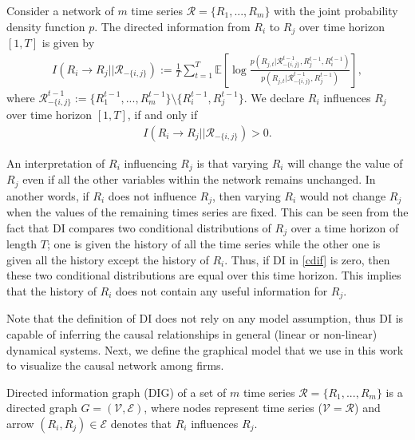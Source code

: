 \clearpage

 \begin{definition}\label{cdi}
Consider a network of $m$ time series $\mathcal{R}=\{R_1,...,R_m\}$ with the joint probability density function $p$. The directed information from $R_i$ to $R_j$ over time horizon $[1,T]$ is given by
\begin{align}\label{cdif}
I(R_i\rightarrow R_j||\mathcal{R}_{-\{i,j\}}):=\frac{1}{T}\sum_{t=1}^T\mathbb{E}\left[\log\frac{p(R_{j,t}|\mathcal{R}^{t-1}_{-\{i,j\}},R_{j}^{t-1},R_{i}^{t-1})}{p(R_{j,t}|\mathcal{R}^{t-1}_{-\{i,j\}},R_{j}^{t-1})}\right],
\end{align}
where $\mathcal{R}_{-\{i,j\}}^{t-1}\!:=\!\{R_{1}^{t-1},...,R_{m}^{t-1}\}\!\setminus\!\{R_{i}^{t-1},R_{j}^{t-1}\}$.
We declare $R_i$ influences $R_j$ over time horizon $[1,T]$, if and only if
\begin{align}\label{cdif1}
I(R_i\rightarrow R_j||\mathcal{R}_{-\{i,j\}})>0.
\end{align}
 \end{definition}
 
An interpretation of $R_i$ influencing $R_j$ is that varying $R_i$ will change the value of $R_j$ even if all the other variables within the network remains unchanged. 
 In another words, if $R_i$ does not influence $R_j$, then varying $R_i$ would not change $R_j$ when the values of the remaining times series are fixed. 
 This can be seen from the fact that DI compares two conditional distributions of $R_j$ over a time horizon of length $T$; one is given the history of all the time series while the other one is given all the history except the history of $R_i$. Thus, if DI in \eqref{cdif} is zero, then these two conditional distributions are equal over this time horizon. This implies that the history of $R_i$ does not contain any useful information for $R_j$.  
 
 
Note that the definition of DI does not rely on any model assumption, thus DI is capable of inferring the causal relationships in general (linear or non-linear) dynamical systems. Next, we define the graphical model that we use in this work to visualize the causal network among firms.


\begin{definition}\label{DIG1}
Directed information graph (DIG) of a set of $m$ time series $\mathcal{R}=\{R_1,...,R_m\}$ is a directed graph $G=(\mathcal{V},\mathcal{E})$, where nodes represent time series ($\mathcal{V}=\mathcal{R}$) and arrow $(R_i,R_j)\in \mathcal{E}$ denotes that $R_i$ influences $R_j$. 
\end{definition} 

